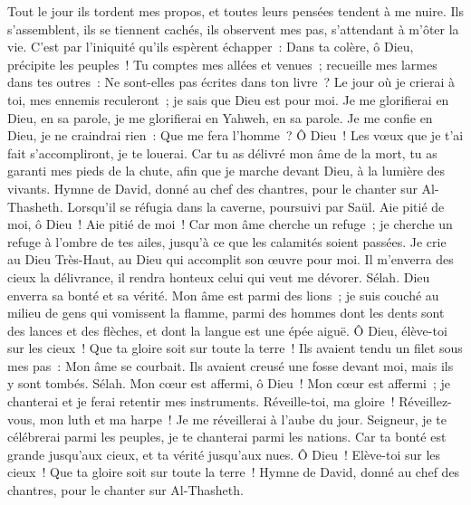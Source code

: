 \begin{multicols}{2}
Tout le jour ils tordent mes propos, et toutes leurs pensées tendent à me nuire.
Ils s'assemblent, ils se tiennent cachés, ils observent mes pas, s'attendant à m'ôter la vie.
C'est par l'iniquité qu'ils espèrent échapper~: Dans ta colère, ô Dieu, précipite les peuples~!
Tu comptes mes allées et venues~; recueille mes larmes dans tes outres~: Ne sont-elles pas écrites dans ton livre~?
Le jour où je crierai à toi, mes ennemis reculeront~; je sais que Dieu est pour moi.
Je me glorifierai en Dieu, en sa parole, je me glorifierai en Yahweh, en sa parole.
Je me confie en Dieu, je ne craindrai rien~: Que me fera l'homme~?
Ô Dieu~! Les vœux que je t'ai fait s'accompliront, je te louerai.
Car tu as délivré mon âme de la mort, tu as garanti mes pieds de la chute, afin que je marche devant Dieu, à la lumière des vivants.
\VerseOne{}Hymne de David, donné au chef des chantres, pour le chanter sur Al-Thasheth. Lorsqu'il se réfugia dans la caverne, poursuivi par Saül.
Aie pitié de moi, ô Dieu~! Aie pitié de moi~! Car mon âme cherche un refuge~; je cherche un refuge à l'ombre de tes ailes, jusqu'à ce que les calamités soient passées.
Je crie au Dieu Très-Haut, au Dieu qui accomplit son œuvre pour moi.
Il m'enverra des cieux la délivrance, il rendra honteux celui qui veut me dévorer. Sélah. Dieu enverra sa bonté et sa vérité.
Mon âme est parmi des lions~; je suis couché au milieu de gens qui vomissent la flamme, parmi des hommes dont les dents sont des lances et des flèches, et dont la langue est une épée aiguë.
Ô Dieu, élève-toi sur les cieux~! Que ta gloire soit sur toute la terre~!
Ils avaient tendu un filet sous mes pas~: Mon âme se courbait. Ils avaient creusé une fosse devant moi, mais ils y sont tombés. Sélah.
Mon cœur est affermi, ô Dieu~! Mon cœur est affermi~; je chanterai et je ferai retentir mes instruments.
Réveille-toi, ma gloire~! Réveillez-vous, mon luth et ma harpe~! Je me réveillerai à l'aube du jour.
Seigneur, je te célébrerai parmi les peuples, je te chanterai parmi les nations.
Car ta bonté est grande jusqu'aux cieux, et ta vérité jusqu'aux nues.
Ô Dieu~! Elève-toi sur les cieux~! Que ta gloire soit sur toute la terre~!
\VerseOne{}Hymne de David, donné au chef des chantres, pour le chanter sur Al-Thasheth.

\end{multicols}
